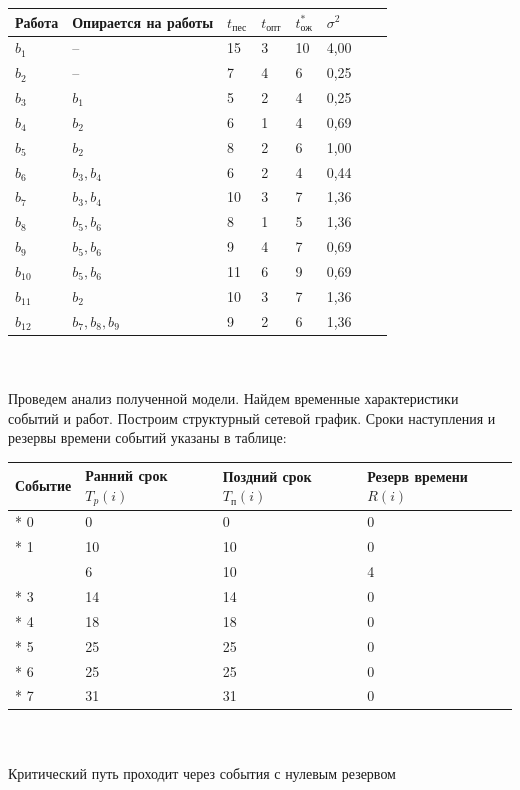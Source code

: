 \documentclass[a4paper, 12pt]{report}
\begin{document}
	\begin{tabular}{ |p{3cm}||p{4cm}||p{1cm}||p{1cm}||p{1cm}||p{1cm}||p{1cm}||p{1cm}|}
		\hline
		Работа & Опирается на работы & $t_\text{пес}$ & $t_\text{опт}$& $t_\text{ож}^*$ & $\sigma^2$\\
		\hline
		$b_1$ & -- & 15 & 3 & 10 & 4,00\\
		$b_2$ & -- & 7  & 4 & 6 & 0,25\\
		$b_3$ & $b_1$ & 5 & 2  & 4 & 0,25\\
		$b_4$ & $b_2$ & 6  & 1  & 4 & 0,69\\
		$b_5$ & $b_2$ & 8 & 2  & 6 & 1,00\\
		$b_6$ & $b_3,b_4$ & 6  & 2  & 4 & 0,44\\
		$b_7$ & $b_3,b_4$ & 10  & 3  & 7 & 1,36\\
		$b_8$ & $b_5,b_6$ & 8  & 1  & 5 & 1,36\\
		$b_9$ & $b_5,b_6$ & 9  & 4  & 7 & 0,69\\
		$b_{10}$ & $b_5,b_6$ & 11 & 6  & 9 & 0,69\\
		$b_{11}$ & $b_2$ & 10  & 3  & 7 & 1,36\\
		$b_{12}$ & $b_7,b_8,b_9$ & 9 & 2 & 6 & 1,36\\
		\hline
	\end{tabular}\\\\
	Проведем анализ полученной модели. Найдем временные характеристики событий и работ. Построим структурный сетевой график.
	Сроки наступления и резервы времени событий указаны в таблице: \\
	\begin{tabular}{ |p{3cm}||p{3cm}||p{3cm}||p{3cm}|  }
		\hline
		Событие & Ранний срок $T_p(i)$ & Поздний срок $T_\text{п}(i)$ & Резерв времени $R(i)$\\
		\hline
		* 0 & 0 & 0 & 0\\
		* 1 & 10 & 10 & 0\\
		\;\;\;2 & 6 & 10 & 4\\
		* 3 & 14 & 14 & 0\\
		* 4 & 18 & 18 & 0\\
		* 5 & 25 & 25 & 0\\
		* 6 & 25 & 25 & 0\\
		* 7 & 31 & 31 & 0\\
		\hline
	\end{tabular}\\\\
	Критический путь проходит через события с нулевым резервом
\end{document}
